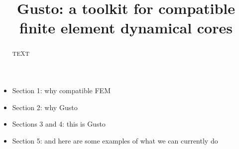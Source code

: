 \documentclass[journal abbreviation, manuscript]{copernicus}
\begin{document}
\title{Gusto: a toolkit for compatible finite element dynamical cores}















\received{}
\pubdiscuss{} %
\revised{}
\accepted{}
\published{}




\maketitle



\begin{abstract}
TEXT
\end{abstract}

\begin{itemize}
\item Section 1: why compatible FEM
\item Section 2: why Gusto
\item Sections 3 and 4: this is Gusto
\item Section 5: and here are some examples of what we can currently do
\end{itemize}
\end{document}
